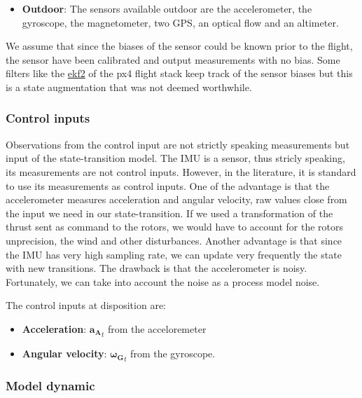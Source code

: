 \documentclass[]{article}
\providecommand{\tightlist}{%
  \setlength{\itemsep}{0pt}\setlength{\parskip}{0pt}}
\begin{document}
\begin{itemize}
\tightlist
\item
  \textbf{Outdoor}: The sensors available outdoor are the accelerometer,
  the gyroscope, the magnetometer, two GPS, an optical flow and an
  altimeter.
\end{itemize}

We assume that since the biases of the sensor could be known prior to
the flight, the sensor have been calibrated and output measurements with
no bias. Some filters like the
\href{https://dev.px4.io/en/tutorials/tuning_the_ecl_ekf.html}{ekf2} of
the px4 flight stack keep track of the sensor biases but this is a state
augmentation that was not deemed worthwhile.

\subsubsection{Control inputs}\label{control-inputs}

Observations from the control input are not strictly speaking
measurements but input of the state-transition model. The IMU is a
sensor, thus stricly speaking, its measurements are not control inputs.
However, in the literature, it is standard to use its measurements as
control inputs. One of the advantage is that the accelerometer measures
acceleration and angular velocity, raw values close from the input we
need in our state-transition. If we used a transformation of the thrust
sent as command to the rotors, we would have to account for the rotors
unprecision, the wind and other disturbances. Another advantage is that
since the IMU has very high sampling rate, we can update very frequently
the state with new transitions. The drawback is that the accelerometer
is noisy. Fortunately, we can take into account the noise as a process
model noise.

The control inputs at disposition are:

\begin{itemize}
\tightlist
\item
  \textbf{Acceleration}: \(\mathbf{a_A}_t\) from the acceloremeter
\item
  \textbf{Angular velocity}: \(\mathbf{\boldsymbol{\omega}_G}_t\) from
  the gyroscope.
\end{itemize}

\hypertarget{model-dynamic}{\subsubsection{Model
dynamic}\label{model-dynamic}}
\end{document}
